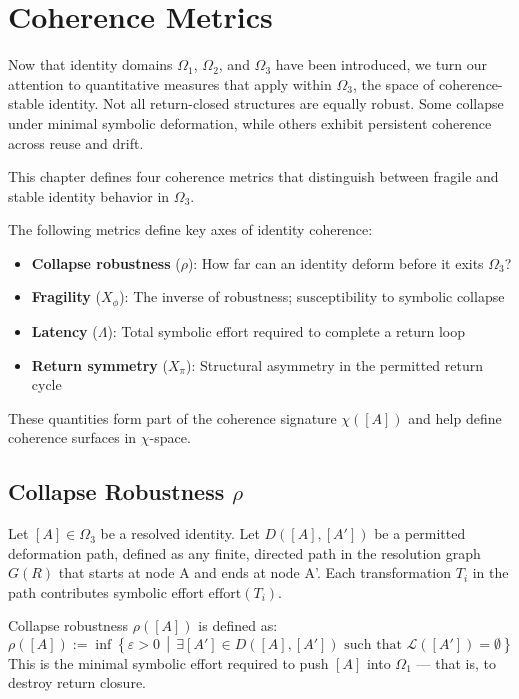 \chapter{Coherence Metrics}

Now that identity domains $\Omega_1$, $\Omega_2$, and $\Omega_3$ have been introduced,  
we turn our attention to quantitative measures that apply within $\Omega_3$, the space of coherence-stable identity.  
Not all return-closed structures are equally robust.  
Some collapse under minimal symbolic deformation, while others exhibit persistent coherence across reuse and drift.

This chapter defines four coherence metrics that distinguish between fragile and stable identity behavior in $\Omega_3$.

The following metrics define key axes of identity coherence:

\begin{itemize}
  \item \textbf{Collapse robustness} ($\rho$): How far can an identity deform before it exits $\Omega_3$?
  \item \textbf{Fragility} ($X_\phi$): The inverse of robustness; susceptibility to symbolic collapse
  \item \textbf{Latency} ($\Lambda$): Total symbolic effort required to complete a return loop
  \item \textbf{Return symmetry} ($X_\pi$): Structural asymmetry in the permitted return cycle
\end{itemize}

These quantities form part of the coherence signature $\chi([A])$ and help define coherence surfaces in $\chi$-space.

\section{Collapse Robustness $\rho$}

Let $[A] \in \Omega_3$ be a resolved identity.  
Let $D([A], [A'])$ be a permitted deformation path, defined as any finite, directed path in the resolution graph $G(R)$ that starts at node A and ends at node A'.  
Each transformation $T_i$ in the path contributes symbolic effort $\text{effort}(T_i)$.

\begin{definition}
Collapse robustness $\rho([A])$ is defined as:
\begin{equation} \label{eq:collapse-robustness}
\rho([A]) := \inf \left\{ \varepsilon > 0 \,\middle|\, \exists [A'] \in D([A], [A']) \text{ such that } \mathcal{L}([A']) = \emptyset \right\}
\end{equation}
This is the minimal symbolic effort required to push $[A]$ into $\Omega_1$ — that is, to destroy return closure.
\end{definition}

